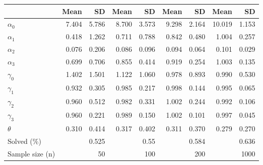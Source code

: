 
\begin{tabular}[t]{lrrrrrrrr}
\toprule
  & Mean & SD & Mean  & SD  & Mean   & SD   & Mean    & SD   \\
\midrule
$\alpha_{0}$ & 7.404 & 5.786 & 8.700 & 3.573 & 9.298 & 2.164 & 10.019 & 1.153\\
$\alpha_{1}$ & 0.418 & 1.262 & 0.711 & 0.788 & 0.842 & 0.480 & 1.004 & 0.257\\
$\alpha_{2}$ & 0.076 & 0.206 & 0.086 & 0.096 & 0.094 & 0.064 & 0.101 & 0.029\\
$\alpha_{3}$ & 0.699 & 0.706 & 0.855 & 0.414 & 0.919 & 0.254 & 1.003 & 0.135\\
$\gamma_{0}$ & 1.402 & 1.501 & 1.122 & 1.060 & 0.978 & 0.893 & 0.990 & 0.530\\
$\gamma_{1}$ & 0.932 & 0.305 & 0.985 & 0.217 & 0.998 & 0.144 & 0.995 & 0.065\\
$\gamma_{2}$ & 0.960 & 0.512 & 0.982 & 0.331 & 1.002 & 0.244 & 0.992 & 0.106\\
$\gamma_{3}$ & 0.960 & 0.221 & 0.989 & 0.150 & 1.002 & 0.101 & 0.997 & 0.045\\
$\theta$ & 0.310 & 0.414 & 0.317 & 0.402 & 0.311 & 0.370 & 0.279 & 0.270\\
Solved (\%) &  & 0.525 &  & 0.55 &  & 0.584 &  & 0.636\\
Sample size (n) &  & 50 &  & 100 &  & 200 &  & 1000\\
\bottomrule
\end{tabular}
